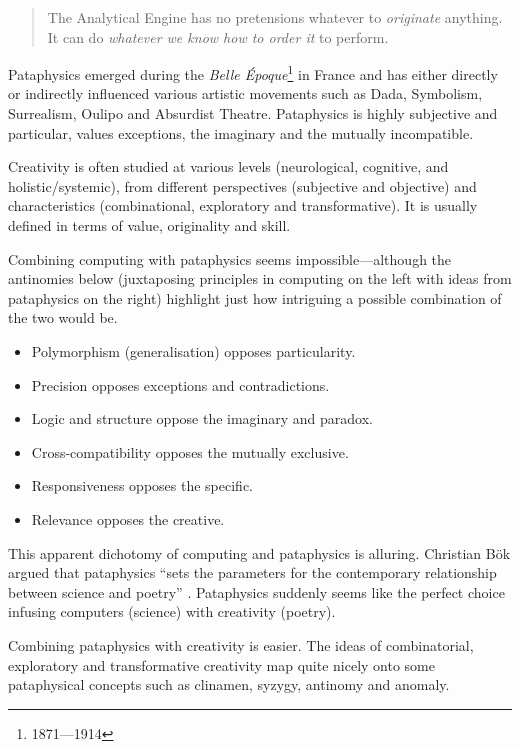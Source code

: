\begin{quotation}
  The Analytical Engine has no pretensions whatever to \textit{originate} anything. It can do \textit{whatever we know how to order it} to perform. 
\end{quotation}

Pataphysics emerged during the \textit{Belle Époque}\footnote{1871---1914} in France and has either directly or indirectly influenced various artistic movements such as Dada, Symbolism, Surrealism, Oulipo and Absurdist Theatre. Pataphysics is highly subjective and particular, values exceptions, the imaginary and the mutually incompatible.

Creativity is often studied at various levels (neurological, cognitive, and holistic/systemic), from different perspectives (subjective and objective) and characteristics (combinational, exploratory and transformative). It is usually defined in terms of value, originality and skill.

Combining computing with pataphysics seems impossible---although the antinomies below (juxtaposing principles in computing on the left with ideas from pataphysics on the right) highlight just how intriguing a possible combination of the two would be.

\begin{itemize}
  \item Polymorphism (generalisation) opposes particularity.
  \item Precision opposes exceptions and contradictions.
  \item Logic and structure oppose the imaginary and paradox.
  \item Cross-compatibility opposes the mutually exclusive.
  \item Responsiveness opposes the specific.
  \item Relevance opposes the creative.
\end{itemize}

This apparent dichotomy of computing and pataphysics is alluring. Christian B{\"o}k argued that pataphysics ``sets the parameters for the contemporary relationship between science and poetry'' \citeyear{Bok2002}. Pataphysics suddenly seems like the perfect choice infusing computers (science) with creativity (poetry).

Combining pataphysics with creativity is easier. The ideas of combinatorial, exploratory and transformative creativity map quite nicely onto some pataphysical concepts such as clinamen, syzygy, antinomy and anomaly. 

